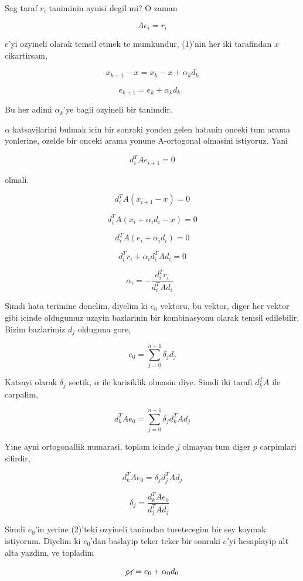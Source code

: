 \documentclass[12pt,fleqn]{article}\usepackage{../common}
\begin{document}
Sag taraf $r_i$ taniminin aynisi degil mi? O zaman 

\begin{equation}\label{5}
Ae_i = r_i 
\end{equation}

$e$'yi ozyineli olarak temsil etmek te mumkundur, (1)'nin her iki
tarafindan $x$ cikartirsam, 

\[ x_{k+1} - x = x_k - x + \alpha_k d_{k} \]

\[ e_{k+1} = e_k + \alpha_k d_k \ \ \ \label{2}\]

Bu her adimi $\alpha_k$'ye bagli ozyineli bir tanimdir. 

$\alpha$ katsayilarini bulmak icin bir sonraki yonden gelen hatanin onceki
tum arama yonlerine, ozelde bir onceki arama yonune A-ortogonal
olmasini istiyoruz. Yani

\[ d_i^TA e_{i+1}  = 0\]

olmali. 

\[ d_i^TA (x_{i+1}-x)  = 0\]

\[ d_i^TA (x_{i} + \alpha_i d_i -x)  = 0\]

\[ d_i^TA (e_i + \alpha_i d_i )  = 0\]

\[ d_i^Tr_i + \alpha_i d_i^TA d_i   = 0\]

\[ \alpha_i = -\frac{ d_i^Tr_i}{d_i^T A d_i} 
\ \ \ \label{6}
\]

Simdi hata terimine donelim, diyelim ki $e_0$ vektoru, bu vektor, diger
her vektor gibi icinde oldugumuz uzayin bazlarinin bir kombinasyonu olarak
temsil edilebilir. Bizim bazlarimiz $d_j$ olduguna gore, 

\[ e_0 = \sum _{ j=0}^{n-1} \delta_j d_j \]

Katsayi olarak $\delta_j$ sectik, $\alpha$ ile karisiklik olmasin
diye. Simdi iki tarafi $d_k^T A$ ile carpalim, 

\[ d_k^T A e_0 = \sum _{ j=0}^{n-1} \delta_j d_k^T A d_j \]

Yine ayni ortogonallik numarasi, toplam icinde $j$ olmayan tum diger $p$
carpimlari sifirdir, 

\[ d_k^T A e_0 =  \delta_j d_j^T A d_j \]

\[ \delta_j = \frac{ d_k^T A e_0}{ d_j^T A d_j } 
\ \ \ \label{4}
\]

Simdi $e_0$'in yerine (2)'teki ozyineli tanimdan turetecegim bir sey koymak
istiyorum. Diyelim ki $e_0$'dan baslayip teker teker bir sonraki $e$'yi
hesaplayip alt alta yazdim, ve topladim

\[ \cancel{e_{1}} = e_0 + \alpha_0 d_0\]
\end{document}
